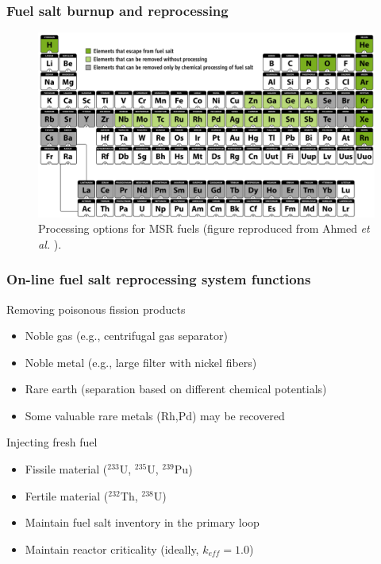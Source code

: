 \begin{frame}
\frametitle{Fuel salt burnup and reprocessing}
		\vspace{-5mm}
	\begin{figure}[t]
		\hspace*{-0.2in}
			\includegraphics[height=0.6\textwidth]{./images/periodic_map.png}
		\vspace{-0.15in}
		\caption{Processing options for MSR fuels (figure reproduced from Ahmed \emph{et al.}  \cite{ahmad_neutronics_2015}).}
	\end{figure}               
\end{frame}


\begin{frame}
\frametitle{On-line fuel salt reprocessing system functions}
\begin{block}{Removing poisonous fission products}
	\begin{itemize}
		\item Noble gas (e.g., centrifugal gas separator)
		\item Noble metal (e.g., large filter with nickel fibers)
       \item Rare earth (separation based on different chemical potentials)
		\item Some valuable rare metals (Rh,Pd) may be recovered %
	\end{itemize}
\end{block}

\begin{block}{Injecting fresh fuel}
	\begin{itemize}
		\item Fissile material ($^{233}$U, $^{235}$U, $^{239}$Pu)
		\item Fertile material ($^{232}$Th, $^{238}$U)
		\item Maintain fuel salt inventory in the primary loop
		\item Maintain reactor criticality (ideally, $k_{eff}=1.0$)
	\end{itemize}
\end{block}

\end{frame}

